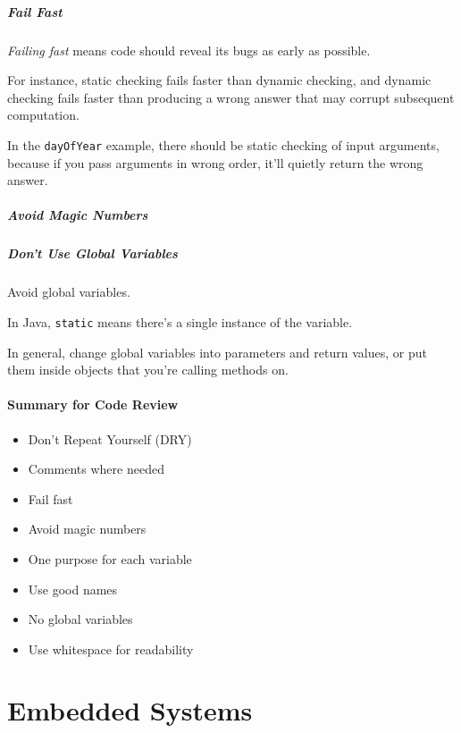 \documentclass[10pt]{amsart}
\begin{document}
\subsubsection{Fail Fast}

\emph{Failing fast} means code should reveal its bugs as early as possible. 

For instance, static checking fails faster than dynamic checking, and dynamic checking fails faster than producing a wrong answer that may corrupt subsequent computation.

In the \verb|dayOfYear| example, there should be static checking of input arguments, because if you pass arguments in wrong order, it'll quietly return the wrong answer.

\subsubsection{Avoid Magic Numbers}

\subsubsection{Don't Use Global Variables}

Avoid global variables.

In Java, \verb|static| means there's a single instance of the variable.

In general, change global variables into parameters and return values, or put them inside objects that you're calling methods on.


\subsection{Summary for Code Review}

\begin{itemize}
	\item Don't Repeat Yourself (DRY)
	\item Comments where needed
	\item Fail fast
	\item Avoid magic numbers
	\item One purpose for each variable
	\item Use good names
	\item No global variables
	\item Use whitespace for readability
\end{itemize}



\part{Embedded Systems}
\end{document}
